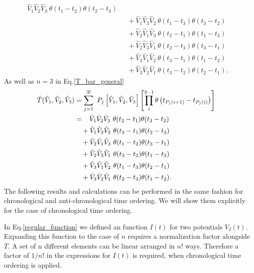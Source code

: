 \documentclass[12pt, titlepage]{article}
\begin{document}
\begin{subappendices}
\begin{equation}
\begin{split}
\hat{V}_{1}\hat{V}_{2}\hat{V}_{3}\  \theta(t_{1}-t_{2}) \theta(t_{2}-t_{3})
	\\
	& \ \ \ +\hat{V}_{1}\hat{V}_{3}\hat{V}_{2}\   \theta(t_{1}-t_{3})\theta(t_{3}-t_{2})
	\\
	& \ \ \ +\hat{V}_{2}\hat{V}_{1}\hat{V}_{3} \  \theta(t_{2}-t_{1})\theta(t_{1}-t_{3})
	\\
	& \ \ \ +\hat{V}_{2}\hat{V}_{3}\hat{V}_{1}\   \theta(t_{2}-t_{3})\theta(t_{3}-t_{1})
	\\
	& \ \ \ +\hat{V}_{3}\hat{V}_{1}\hat{V}_{2}\   \theta(t_{3}-t_{1})\theta(t_{1}-t_{2})
	\\
	& \ \ \ +\hat{V}_{3}\hat{V}_{2}\hat{V}_{1}\  \theta(t_{3}-t_{2})\theta(t_{2}-t_{1}).
\end{split}
\end{equation}
As well as $ n=3 $ in Eq.\enskip\eqref{T_bar_general}
\begin{equation}
\begin{split}
\bar{T}(\hat{V}_1, \hat{V}_2,\hat{V}_3)
&=
\sum_{j=1}^{3!}\ P_{j}
\left[
\hat{V}_1, \hat{V}_2,\hat{V}_3
 \right]  
\left[
\prod^{3-1}_{i}
\theta
	\left(
	t_{P_{j}(i+1)}-t_{P_{j}(i)}
	\right)
\right]\
\\
&=\enspace\thinspace\thinspace
\hat{V}_{1}\hat{V}_{2}\hat{V}_{3}\  \theta(t_2 -t_1)\theta(t_3 -t_2)
	\\
	& \ \ \ +\hat{V}_{1}\hat{V}_{3}\hat{V}_{2}\   \theta(t_3 -t_1)\theta(t_2 -t_3)
	\\
	& \ \ \ +\hat{V}_{2}\hat{V}_{1}\hat{V}_{3}\  \theta(t_1 -t_2)\theta(t_3 -t_1)
	\\
	& \ \ \ +\hat{V}_{2}\hat{V}_{3}\hat{V}_{1}\   \theta(t_3 -t_2)\theta(t_1 -t_3)
	\\
	& \ \ \ +\hat{V}_{3}\hat{V}_{1}\hat{V}_{2} \  \theta(t_1 -t_3)\theta(t_2 -t_1)
	\\
	& \ \ \ +\hat{V}_{3}\hat{V}_{2}\hat{V}_{1} \  \theta(t_2 -t_3)\theta(t_1 -t_2)
.
\end{split}
\end{equation}
The following results and calculations can be performed in the same fashion for chronological and anti-chronological time ordering. We will show them explicitly for the case of chronological time ordering.

In Eq.\enskip\eqref{regular_function} we defined an function $ I(t)$ for two potentials $ V_I(t) $. Expanding this function to the case of $ n $ requires a normalization factor alongside $ T $. A set of n different elements can be linear arranged in $ n! $ ways. Therefore a factor of $ 1/{n!} $ in the expressions for $ I(t)$ is required, when chronological time ordering is applied.  


\end{subappendices}
\end{document}
